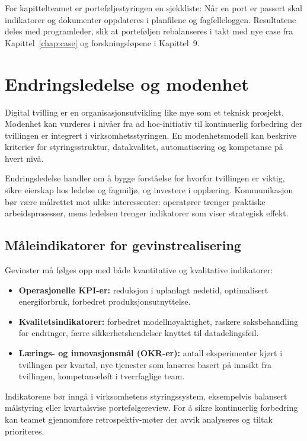 For kapittelteamet er porteføljestyringen en sjekkliste: Når en port er passert skal indikatorer og dokumenter oppdateres i planfilene og fagfelleloggen. Resultatene deles med programleder, slik at porteføljen rebalanseres i takt med nye case fra Kapittel~\ref{chap:case} og forskningsløpene i Kapittel~9.

\section{Endringsledelse og modenhet}
Digital tvilling er en organisasjonsutvikling like mye som et teknisk prosjekt. Modenhet kan vurderes i nivåer fra ad hoc-initiativ til kontinuerlig forbedring der tvillingen er integrert i virksomhetsstyringen. En modenhetsmodell kan beskrive kriterier for styringsstruktur, datakvalitet, automatisering og kompetanse på hvert nivå.

Endringsledelse handler om å bygge forståelse for hvorfor tvillingen er viktig, sikre eierskap hos ledelse og fagmiljø, og investere i opplæring. Kommunikasjon bør være målrettet mot ulike interessenter: operatører trenger praktiske arbeidsprosesser, mens ledelsen trenger indikatorer som viser strategisk effekt.

\subsection*{Måleindikatorer for gevinstrealisering}
Gevinster må følges opp med både kvantitative og kvalitative indikatorer:
\begin{itemize}
    \item \textbf{Operasjonelle KPI-er:} reduksjon i uplanlagt nedetid, optimalisert energiforbruk, forbedret produksjonsutnyttelse.
    \item \textbf{Kvalitetsindikatorer:} forbedret modellnøyaktighet, raskere saksbehandling for endringer, færre sikkerhetshendelser knyttet til datadelingsfeil.
    \item \textbf{Lærings- og innovasjonsmål (OKR-er):} antall eksperimenter kjørt i tvillingen per kvartal, nye tjenester som lanseres basert på innsikt fra tvillingen, kompetanseløft i tverrfaglige team.
\end{itemize}
Indikatorene bør inngå i virksomhetens styringssystem, eksempelvis balansert målstyring eller kvartalsvise portefølgereview. For å sikre kontinuerlig forbedring kan teamet gjennomføre retrospektiv-møter der avvik analyseres og tiltak prioriteres.

